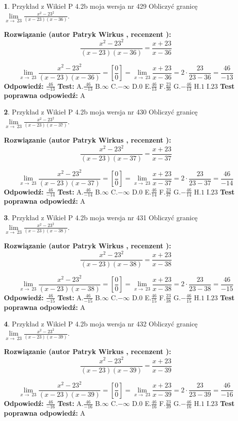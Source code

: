 \documentclass[12pt, a4paper]{article}
\theoremstyle{definition} %
\newtheorem{zad}{}
\newcommand{\zadStart}[1]{\begin{zad}#1\newline}
\newcommand{\zadStop}{\end{zad}}
\newcommand{\rozwStart}[2]{\noindent \textbf{Rozwiązanie (autor #1 , recenzent #2): }\newline}
\newcommand{\rozwStop}{\newline}
\newcommand{\odpStart}{\noindent \textbf{Odpowiedź:}\newline}
\newcommand{\odpStop}{\newline}
\newcommand{\testStart}{\noindent \textbf{Test:}\newline}
\newcommand{\testStop}{\newline}
\newcommand{\kluczStart}{\noindent \textbf{Test poprawna odpowiedź:}\newline}
\newcommand{\kluczStop}{\newline}
\begin{document}
\zadStart{Przykład z Wikieł P 4.2b moja wersja nr 429}
Obliczyć granicę $\lim\limits_{x\to\ 23}\frac{x^{2}-23^{2}}{(x-23)(x-36)}$.
\zadStop
\rozwStart{Patryk Wirkus}{}
$$\frac{x^{2}-23^{2}}{(x-23)(x-36)}=\frac{x+23}{x-36}$$

$$\lim\limits_{x\to\ 23}\frac{x^{2}-23^{2}}{(x-23)(x-36)}=[\frac{0}{0}]=\lim\limits_{x\to\ 23}\frac{x+23}{x-36}=2 \cdot \frac{23}{23-36} = \frac{46}{-13}$$
\rozwStop
\odpStart
$\frac{46}{-13}$
\odpStop
\testStart
A.$\frac{46}{-13}$
B.$\infty$
C.$-\infty$
D.$0$
E.$\frac{46}{13}$
F.$\frac{23}{36}$
G.$-\frac{46}{13}$
H.$1$
I.$23$
\testStop
\kluczStart
A
\kluczStop



\zadStart{Przykład z Wikieł P 4.2b moja wersja nr 430}
Obliczyć granicę $\lim\limits_{x\to\ 23}\frac{x^{2}-23^{2}}{(x-23)(x-37)}$.
\zadStop
\rozwStart{Patryk Wirkus}{}
$$\frac{x^{2}-23^{2}}{(x-23)(x-37)}=\frac{x+23}{x-37}$$

$$\lim\limits_{x\to\ 23}\frac{x^{2}-23^{2}}{(x-23)(x-37)}=[\frac{0}{0}]=\lim\limits_{x\to\ 23}\frac{x+23}{x-37}=2 \cdot \frac{23}{23-37} = \frac{46}{-14}$$
\rozwStop
\odpStart
$\frac{46}{-14}$
\odpStop
\testStart
A.$\frac{46}{-14}$
B.$\infty$
C.$-\infty$
D.$0$
E.$\frac{46}{14}$
F.$\frac{23}{37}$
G.$-\frac{46}{14}$
H.$1$
I.$23$
\testStop
\kluczStart
A
\kluczStop



\zadStart{Przykład z Wikieł P 4.2b moja wersja nr 431}
Obliczyć granicę $\lim\limits_{x\to\ 23}\frac{x^{2}-23^{2}}{(x-23)(x-38)}$.
\zadStop
\rozwStart{Patryk Wirkus}{}
$$\frac{x^{2}-23^{2}}{(x-23)(x-38)}=\frac{x+23}{x-38}$$

$$\lim\limits_{x\to\ 23}\frac{x^{2}-23^{2}}{(x-23)(x-38)}=[\frac{0}{0}]=\lim\limits_{x\to\ 23}\frac{x+23}{x-38}=2 \cdot \frac{23}{23-38} = \frac{46}{-15}$$
\rozwStop
\odpStart
$\frac{46}{-15}$
\odpStop
\testStart
A.$\frac{46}{-15}$
B.$\infty$
C.$-\infty$
D.$0$
E.$\frac{46}{15}$
F.$\frac{23}{38}$
G.$-\frac{46}{15}$
H.$1$
I.$23$
\testStop
\kluczStart
A
\kluczStop



\zadStart{Przykład z Wikieł P 4.2b moja wersja nr 432}
Obliczyć granicę $\lim\limits_{x\to\ 23}\frac{x^{2}-23^{2}}{(x-23)(x-39)}$.
\zadStop
\rozwStart{Patryk Wirkus}{}
$$\frac{x^{2}-23^{2}}{(x-23)(x-39)}=\frac{x+23}{x-39}$$

$$\lim\limits_{x\to\ 23}\frac{x^{2}-23^{2}}{(x-23)(x-39)}=[\frac{0}{0}]=\lim\limits_{x\to\ 23}\frac{x+23}{x-39}=2 \cdot \frac{23}{23-39} = \frac{46}{-16}$$
\rozwStop
\odpStart
$\frac{46}{-16}$
\odpStop
\testStart
A.$\frac{46}{-16}$
B.$\infty$
C.$-\infty$
D.$0$
E.$\frac{46}{16}$
F.$\frac{23}{39}$
G.$-\frac{46}{16}$
H.$1$
I.$23$
\testStop
\kluczStart
A
\kluczStop
\end{document}
